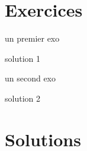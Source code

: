 \documentclass[french,10pt]{book}
\begin{document}
\ReglePied
\entete{}{}{}






\section*{Exercices}

\begin{question}
un premier exo
\end{question}

\begin{solution}
solution 1
\end{solution}


\begin{question}
un second exo
\end{question}

\begin{solution}
solution 2
\end{solution}


\section*{Solutions}

\printsolutions
\end{document}
